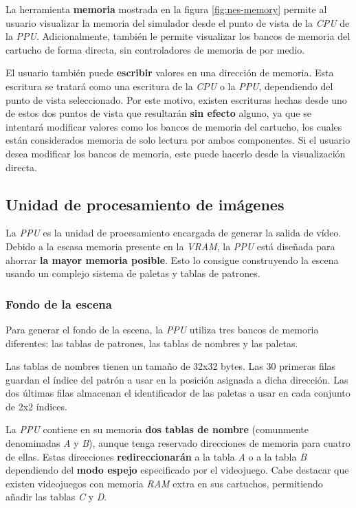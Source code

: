La herramienta \textbf{memoria} mostrada en la
figura \ref{fig:nes-memory} permite
al usuario visualizar la memoria del simulador desde
el punto de vista de la \textit{CPU} de la \textit{PPU}.
Adicionalmente, también le permite visualizar los bancos
de memoria del cartucho de forma directa, sin controladores
de memoria de por medio.

El usuario también puede \textbf{escribir} valores en una
dirección de memoria.
Esta escritura se tratará como una escritura de la \textit{CPU}
o la \textit{PPU}, dependiendo del punto de vista seleccionado.
Por este motivo, existen escrituras hechas desde uno de estos
dos puntos de vista que resultarán \textbf{sin efecto} alguno,
ya que se intentará modificar valores como los bancos de memoria
del cartucho, los cuales están considerados memoria de solo
lectura por ambos componentes.
Si el usuario desea modificar los bancos de memoria, este puede
hacerlo desde la visualización directa.

\subsection{Unidad de procesamiento de imágenes}\label{subsec:unidad-de-procesamiento-de-imagenes}

La \textit{PPU}\cite{PPU} es la unidad de procesamiento encargada de generar
la salida de vídeo.
Debido a la escasa memoria presente en la \textit{VRAM}, la \textit{PPU}
está diseñada para ahorrar \textbf{la mayor memoria posible}.
Esto lo consigue construyendo la escena usando un complejo
sistema de paletas y tablas de patrones.

\subsubsection{Fondo de la escena}\label{subsubsec:fondo-de-la-escena}

Para generar el fondo de la escena, la \textit{PPU} utiliza
tres bancos de memoria diferentes: las tablas de patrones\cite{PATTERN_TABLES},
las tablas de nombres\cite{NAME_TABLES} y las paletas\cite{PALETTES}.

Las tablas de nombres tienen un tamaño de 32x32 bytes.
Las 30 primeras filas guardan el índice del patrón
a usar en la posición asignada a dicha dirección.
Las dos últimas filas almacenan el identificador de las
paletas a usar en cada conjunto de 2x2 índices.

La \textit{PPU} contiene en su memoria \textbf{dos tablas de nombre}
(comunmente denominadas \textit{A} y \textit{B}),
aunque tenga reservado direcciones de memoria para cuatro de ellas.
Estas direcciones \textbf{redireccionarán} a la tabla
\textit{A} o a la tabla \textit{B} dependiendo
del \textbf{modo espejo}\cite{MIRRORING} especificado por el videojuego.
Cabe destacar que existen videojuegos con memoria \textit{RAM}
extra en sus cartuchos, permitiendo añadir las tablas \textit{C} y \textit{D}.

